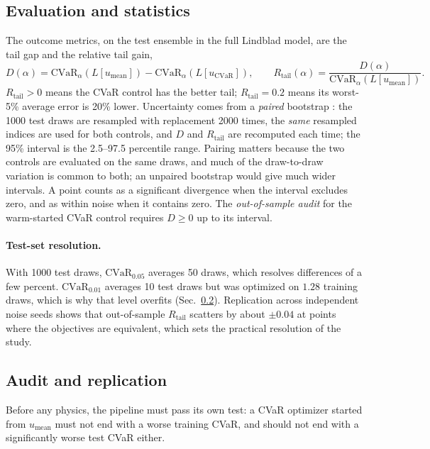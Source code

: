 \documentclass[aps,pra,onecolumn,notitlepage,superscriptaddress,nofootinbib,floatfix]{revtex4-2}
\newcommand{\cvar}{\mathrm{CVaR}}
\newcommand{\Rt}{R_{\mathrm{tail}}}
\newcommand{\umean}{u_{\mathrm{mean}}}
\newcommand{\ucvar}{u_{\cvar}}
\begin{document}
\subsection{Evaluation and statistics}
\label{sec:stats}

The outcome metrics, on the test ensemble in the full Lindblad model, are
the tail gap and the relative tail gain,
\begin{equation}
D(\alpha)=\cvar_\alpha(L[\umean])-\cvar_\alpha(L[\ucvar]),\qquad
\Rt(\alpha)=\frac{D(\alpha)}{\cvar_\alpha(L[\umean])}.
\label{eq:rtail}
\end{equation}
$\Rt>0$ means the CVaR control has the better tail; $\Rt=0.2$ means its
worst-5\% average error is 20\% lower. Uncertainty comes from a \emph{paired}
bootstrap \cite{Efron1993}: the 1000 test draws are resampled with
replacement 2000 times, the \emph{same} resampled indices are used for both
controls, and $D$ and $\Rt$ are recomputed each time; the 95\% interval is
the 2.5--97.5 percentile range. Pairing matters because the two controls are
evaluated on the same draws, and much of the draw-to-draw variation is
common to both; an unpaired bootstrap would give much wider intervals. A
point counts as a significant divergence when the interval excludes zero, and
as within noise when it contains zero. The \emph{out-of-sample audit} for the
warm-started CVaR control requires $D\ge0$ up to its interval.

\paragraph*{Test-set resolution.} With 1000 test draws, $\cvar_{0.05}$ averages
50 draws, which resolves differences of a few percent. $\cvar_{0.01}$
averages 10 test draws but was optimized on $1.28$ training draws, which is why
that level overfits (Sec.~\ref{sec:audit}). Replication across independent
noise seeds shows that out-of-sample $\Rt$ scatters by about $\pm0.04$ at
points where the objectives are equivalent, which sets the practical
resolution of the study.


\subsection{Audit and replication}
\label{sec:audit}
Before any physics, the pipeline must pass its own test: a CVaR optimizer
started from $\umean$ must not end with a worse training CVaR, and should not
end with a significantly worse test CVaR either.
\end{document}
